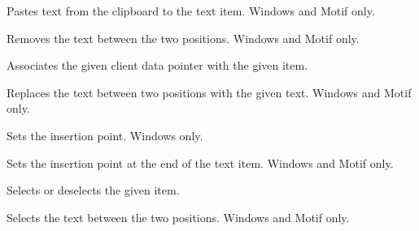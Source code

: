 

Pastes text from the clipboard to the text item. Windows and Motif only.



Removes the text between the two positions. Windows and Motif only.

%
%



Associates the given client data pointer with the given item.



Replaces the text between two positions with the given text. Windows and Motif only.

%
%



Sets the insertion point. Windows only.



Sets the insertion point at the end of the text item. Windows and Motif only.



Selects or deselects the given item.


Selects the text between the two positions. Windows and Motif only.

